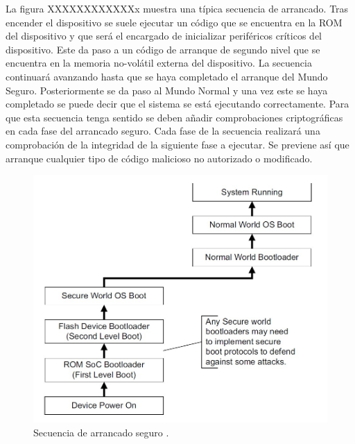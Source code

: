La figura XXXXXXXXXXXXx muestra una típica secuencia de arrancado. Tras encender el dispositivo se suele ejecutar un código que se encuentra en la ROM del dispositivo y que será el encargado de inicializar periféricos críticos del dispositivo. Este da paso a un código de arranque de segundo nivel que se encuentra en la memoria no-volátil externa del dispositivo. La secuencia continuará avanzando hasta que se haya completado el arranque del Mundo Seguro. Posteriormente se da paso al Mundo Normal y una vez este se haya completado se puede decir que el sistema se está ejecutando correctamente.
Para que esta secuencia tenga sentido se deben añadir comprobaciones criptográficas en cada fase del arrancado seguro. Cada fase de la secuencia realizará una comprobación de la integridad de la siguiente fase a ejecutar. Se previene así que arranque cualquier tipo de código malicioso no autorizado o modificado. \newline

\begin{figure}
	\centering
	\includegraphics[width=1\textwidth]{imagenes/secureboot.jpg}
	\caption{\label{fig1}Secuencia de arrancado seguro \cite{trustzone}.}
\end{figure}

